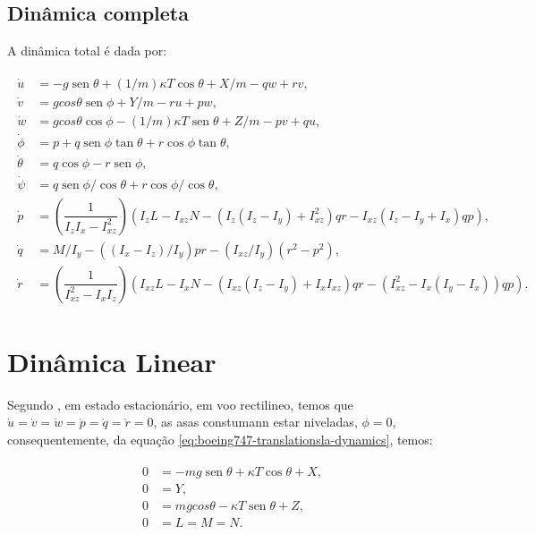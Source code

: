 \documentclass[12pt,a4paper]{article}
\DeclareMathOperator{\sen}{sen}
\begin{document}
\subsection{Dinâmica completa}
\label{subsection:Boeing747DinTotal}
A  dinâmica total é dada por:

\begin{align}
  \begin{split}
    \dot{u} &= - g\sen\theta + (1/m)\kappa T \cos\theta + X/m - qw + rv,\\
    \dot{v} &= g cos\theta \sen\phi + Y/m - ru + pw,\\
    \dot{w} &= g cos\theta \cos\phi - (1/m)\kappa T \sen\theta + Z/m  - pv + qu,\\
              \dot{\phi} &= p + q\sen\phi\tan\theta + r\cos\phi\tan\theta,\\
        \dot{\theta} &= q\cos\phi - r\sen\phi,\\
        \dot{\psi} &= q\sen\phi/\cos\theta + r\cos\phi/\cos\theta,\\
        \dot{p} & =\left(\dfrac{1}{I_zI_x - I_{xz}^2}\right)\left( I_zL - I_{xz}N - (I_z(I_z - I_y) + I_{xz}^2)qr - I_{xz}(I_z -I_y + I_x)qp\right),\\
        \dot{q} &= M/I_y  - ((I_x - I_z)/I_y) pr - (I_{xz}/I_y) (r^2 - p^2) ,\\
        \dot{r} &= \left(\dfrac{1}{I_{xz}^2-I_xI_z}\right)\left(I_{xz} L - I_x N - (I_{xz}(I_z - I_y) +  I_xI_{xz}) qr - (I_{xz}^2  - I_x(I_y - I_x)) qp\right).
  \end{split}
  \label{eq:Boeing747FullDyn}
\end{align}   

\section{Dinâmica Linear}
\label{sec:DinamicaLinear}

Segundo \cite{franklin2013,brysonControlSpacecraftAircraft1994}, em estado estacionário, em voo rectilineo, temos que \(\dot{u}=\dot{v}=\dot{w}=\dot{p}=\dot{q}=\dot{r}=0\), as asas constumann estar niveladas, \(\phi=0\), consequentemente, da equação \eqref{eq:boeing747-translationsla-dynamics}, temos:

\begin{align}
  \begin{split}
    0 &= - mg\sen\theta + \kappa T \cos\theta + X,\\
    0 &=  Y,\\
    0 &= mg cos\theta - \kappa T \sen\theta + Z,\\
    0 &= L = M = N.    
  \end{split}
  \label{eq:}
\end{align}
\end{document}
